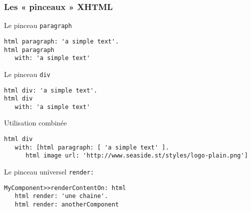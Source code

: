 \documentclass[9pt,compress]{beamer}
\newcommand{\code}[1]{\texttt{\textup{\NoAutoSpaceBeforeFDP #1\AutoSpaceBeforeFDP}}} %
\begin{document}
\begin{frame}[containsverbatim]\frametitle{Les « pinceaux » XHTML}
	\begin{block}{Le pinceau \texttt{paragraph}}
\begin{verbatim}
html paragraph: 'a simple text'.
html paragraph
   with: 'a simple text'
\end{verbatim}
	
	\end{block}
	
	\begin{block}{Le pinceau \texttt{div}}
\begin{verbatim}
html div: 'a simple text'.
html div
   with: 'a simple text'
\end{verbatim}	
	\end{block}

		\begin{block}{Utilisation combinée}
\begin{verbatim}
html div
   with: [html paragraph: [ 'a simple text' ].
      html image url: 'http://www.seaside.st/styles/logo-plain.png']
\end{verbatim}	
		\end{block}

\begin{block}{Le pinceau universel \code{render:}}
\begin{verbatim}
MyComponent>>renderContentOn: html
   html render: 'une chaine'.
   html render: anotherComponent
\end{verbatim}
\end{block}

\end{frame}
\end{document}
